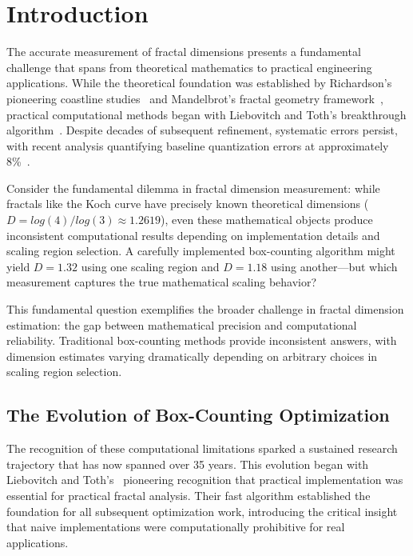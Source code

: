 \documentclass[preprint,12pt]{elsarticle}
\def\log{log}%
\begin{document}

\section{Introduction}
\label{sec:introduction}

The accurate measurement of fractal dimensions presents a fundamental challenge that spans from theoretical mathematics to practical engineering applications. While the theoretical foundation was established by Richardson's pioneering coastline studies~\cite{richardson1961} and Mandelbrot's fractal geometry framework~\cite{mandelbrot1967}, practical computational methods began with Liebovitch and Toth's breakthrough algorithm~\cite{liebovitch1989}. Despite decades of subsequent refinement, systematic errors persist, with recent analysis quantifying baseline quantization errors at approximately 8\%~\cite{bouda2016}.

Consider the fundamental dilemma in fractal dimension measurement: while fractals like the Koch curve have precisely known theoretical dimensions ($D = \log(4)/\log(3) \approx 1.2619$), even these mathematical objects produce inconsistent computational results depending on implementation details and scaling region selection. A carefully implemented box-counting algorithm might yield $D = 1.32$ using one scaling region and $D = 1.18$ using another—but which measurement captures the true mathematical scaling behavior?

This fundamental question exemplifies the broader challenge in fractal dimension estimation: the gap between mathematical precision and computational reliability. Traditional box-counting methods provide inconsistent answers, with dimension estimates varying dramatically depending on arbitrary choices in scaling region selection.

\subsection{The Evolution of Box-Counting Optimization}

The recognition of these computational limitations sparked a sustained research trajectory that has now spanned over 35 years. This evolution began with Liebovitch and Toth's~\cite{liebovitch1989} pioneering recognition that practical implementation was essential for practical fractal analysis. Their fast algorithm established the foundation for all subsequent optimization work, introducing the critical insight that naive implementations were computationally prohibitive for real applications.
\end{document}
